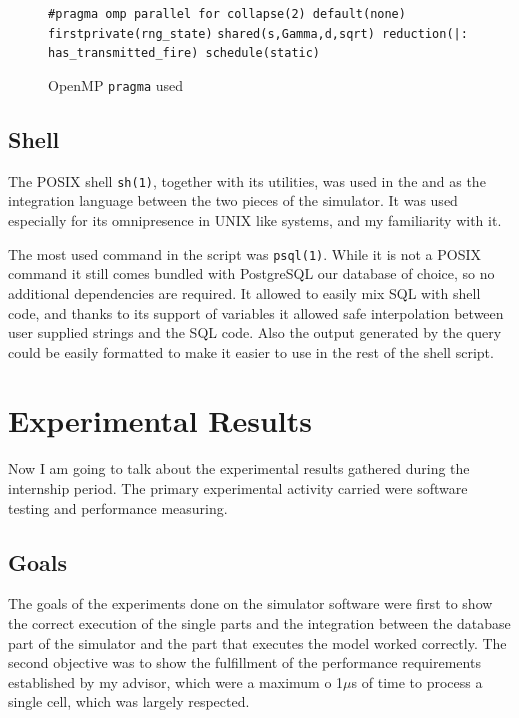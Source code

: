 \documentclass[Lau]{sapthesis} %
\let\oldsection\section
\def\subsection{\oldsection}
\def\section{\chapter}
\begin{document}
\begin{figure}
\centering
\footnotesize
\verb+#pragma omp parallel for collapse(2) default(none) firstprivate(rng_state)+
\verb+shared(s,Gamma,d,sqrt) reduction(|: has_transmitted_fire) schedule(static)+
\caption{OpenMP \texttt{pragma} used}
\label{fig:pragma}
\end{figure}

\subsection{Shell}

The POSIX shell \texttt{sh(1)}, together with its utilities, was used in the and
as the integration language between the two pieces of the simulator. It was used
especially for its omnipresence in UNIX like systems, and my familiarity with
it.

The most used command in the script was \texttt{psql(1)}. While it is not a
POSIX command it still comes bundled with PostgreSQL our database of choice, so
no additional dependencies are required. It allowed to easily mix SQL with shell
code, and thanks to its support of variables it allowed safe interpolation
between user supplied strings and the SQL code. Also the output generated by the
query could be easily formatted to make it easier to use in the rest of the
shell script.

\section{Experimental Results}%

Now I am going to talk about the experimental results gathered during the
internship period. The primary experimental activity carried were software
testing and performance measuring.

\subsection{Goals}

The goals of the experiments done on the simulator software were first to show
the correct execution of the single parts and the integration between the
database part of the simulator and the part that executes the model worked
correctly. The second objective was to show the fulfillment of the performance
requirements established by my advisor, which were a maximum o 1$\mu$s of time
to process a single cell, which was largely respected.
\end{document}

